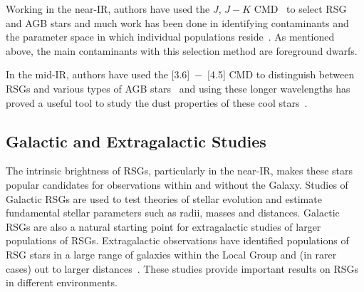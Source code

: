 Working in the near-IR, authors have used the $J$, $J-K$ CMD~\citep[e.g.][]{2000ApJ...542..804N,2006A&A...452..195C,Neugent12,2015ApJ...803...14P} to select RSG and AGB stars and much work has been done in identifying contaminants and the parameter space in which individual populations reside~\citep{2006A&A...452..195C}.
As mentioned above, the main contaminants with this selection method are foreground dwarfs.

In the mid-IR, authors have used the [3.6]~$-$~[4.5] CMD to distinguish between RSGs and various types of AGB stars~\citep{2006AJ....132.2034B,2014A&A...562A..75B,2015A&A...584A..33B,2015ApJ...800...51B,2015A&A...578A.100W} and using these longer wavelengths has proved a useful tool to study the dust properties of these cool stars~\citep{Beasor-prep}.



\subsection{Galactic and Extragalactic Studies} %
\label{sub:galactic_and_extragalactic}

The intrinsic brightness of RSGs, particularly in the near-IR, makes these stars popular candidates for observations within and without the Galaxy.
Studies of Galactic RSGs are used to test theories of stellar evolution and estimate fundamental stellar parameters such as radii, masses and distances.
Galactic RSGs are also a natural starting point for extragalactic studies of larger populations of RSGs.
Extragalactic observations have identified populations of RSG stars in a large range of galaxies within the Local Group and (in rarer cases) out to larger distances~\citep[e.g.][and see Chapter~\ref{ch:ngc55}]{Elias85,Humphreys86, Massey06, 2007AJ....134.2474M, Groenewegen09,Massey13,2015ApJ...805..182G}.
These studies provide important results on RSGs in different environments.



